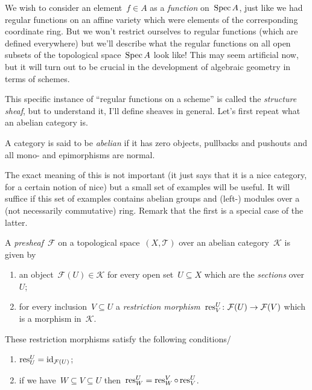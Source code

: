 We wish to consider an element~$f\in A$ as a \emph{function} on~$\operatorname{Spec} A$, just like we had regular functions on an affine variety which were elements of the corresponding coordinate ring. But we won't restrict ourselves to regular functions (which are defined everywhere) but we'll describe what the regular functions on all open subsets of the topological space~$\operatorname{Spec} A$ look like! This may seem artificial now, but it will turn out to be crucial in the development of algebraic geometry in terms of schemes.

This specific instance of ``regular functions on a scheme'' is called the \emph{structure sheaf}, but to understand it, I'll define sheaves in general. Let's first repeat what an abelian category is.

\begin{definition}
  A category is said to be \emph{abelian} if it has zero objects, pullbacks and pushouts and all mono- and epimorphisms are normal.
\end{definition}

The exact meaning of this is not important (it just says that it is a nice category, for a certain notion of nice) but a small set of examples will be useful. It will suffice if this set of examples contains abelian groups and (left-) modules over a (not necessarily commutative) ring. Remark that the first is a special case of the latter.

\begin{definition}
  A \emph{presheaf}~$\mathcal{F}$ on a topological space~$(X,\mathcal{T})$ over an abelian category~$\mathcal{K}$ is given by
  \begin{enumerate}
    \item an object~$\mathcal{F}(U)\in\mathcal{K}$ for every open set~$U\subseteq X$ which are the \emph{sections} over~$U$;
    \item for every inclusion~$V\subseteq U$ a \emph{restriction morphism}~$\operatorname{res}^U_V\colon\mathcal{F}(U)\to\mathcal{F}(V)$ which is a morphism in~$\mathcal{K}$.
  \end{enumerate}

  These restriction morphisms satisfy the following conditions/
  \begin{enumerate}
    \item $\operatorname{res}^U_U=\operatorname{id}_{\mathcal{F}(U)}$;
    \item if we have~$W\subseteq V\subseteq U$ then~$\operatorname{res}^U_W=\operatorname{res}^V_W\circ\operatorname{res}^U_V$.
  \end{enumerate}
\end{definition}


